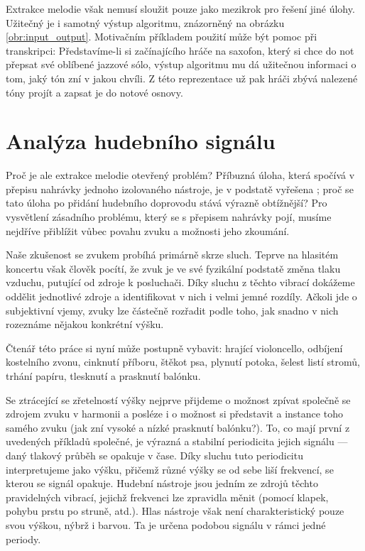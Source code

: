 Extrakce melodie však nemusí sloužit pouze jako mezikrok pro řešení jiné úlohy. Užitečný je i samotný výstup algoritmu, znázorněný na obrázku \ref{obr:input_output}. Motivačním příkladem použití může být pomoc při transkripci: Představíme-li si začínajícího hráče na saxofon, který si chce do not přepsat své oblíbené jazzové sólo, výstup algoritmu mu dá užitečnou informaci o tom, jaký tón zní v jakou chvíli. Z této reprezentace už pak hráči zbývá nalezené tóny projít a zapsat je do notové osnovy.

\section{Analýza hudebního signálu}

Proč je ale extrakce melodie otevřený problém? Příbuzná úloha, která spočívá v přepisu nahrávky jednoho izolovaného nástroje, je v podstatě vyřešena \citep{Mauch2014a}; proč se tato úloha po přidání hudebního doprovodu stává výrazně obtížnější? Pro vysvětlení zásadního problému, který se s přepisem nahrávky pojí, musíme nejdříve přiblížit vůbec povahu zvuku a možnosti jeho zkoumání.

Naše zkušenost se zvukem probíhá primárně skrze sluch. Teprve na hlasitém koncertu však člověk pocítí, že zvuk je ve své fyzikální podstatě změna tlaku vzduchu, putující od zdroje k posluchači. Díky sluchu z těchto vibrací dokážeme oddělit jednotlivé zdroje a identifikovat v nich i velmi jemné rozdíly. Ačkoli jde o subjektivní vjemy, zvuky lze částečně rozřadit podle toho, jak snadno v nich rozeznáme nějakou konkrétní výšku. 

\vspace*{0.5cm}

Čtenář této práce si nyní může postupně vybavit: hrající violoncello, odbíjení kostelního zvonu, cinknutí příboru, štěkot psa, plynutí potoka, šelest listí stromů, trhání papíru, tlesknutí a prasknutí balónku.

\vspace*{0.5cm}

Se ztrácející se zřetelností výšky nejprve přijdeme o možnost zpívat společně se zdrojem zvuku v harmonii a posléze i o možnost si představit  a  instance toho samého zvuku (jak zní vysoké a nízké prasknutí balónku?). To, co mají první z uvedených příkladů společné, je výrazná a stabilní periodicita jejich signálu --- daný tlakový průběh se opakuje v čase. Díky sluchu tuto periodicitu interpretujeme jako výšku, přičemž různé výšky se od sebe liší frekvencí, se kterou se signál opakuje. Hudební nástroje jsou jedním ze zdrojů těchto pravidelných vibrací, jejichž frekvenci lze zpravidla měnit (pomocí klapek, pohybu prstu po struně, atd.). Hlas nástroje však není charakteristický pouze svou výškou, nýbrž i barvou. Ta je určena podobou signálu v rámci jedné periody. 

